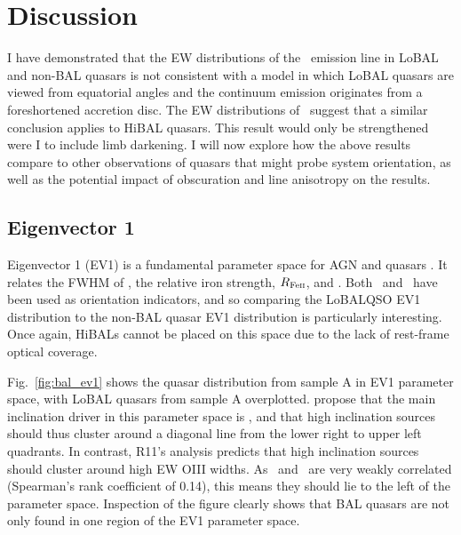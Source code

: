 \section{Discussion}
\label{sec:discuss_ew}
I have demonstrated that the EW distributions of the 
\oiiifull\ emission line in LoBAL and non-BAL
quasars is not consistent with a 
model in which LoBAL quasars are viewed from equatorial angles 
and the continuum emission originates from
a foreshortened accretion disc. The EW distributions of 
\civline\ suggest that a similar conclusion applies to HiBAL quasars.
This result would only be strengthened were 
I to include limb darkening. I will now explore how the above results compare to other
observations of quasars that might probe system orientation, as 
well as the potential impact of obscuration and line anisotropy
on the results.

\subsection{Eigenvector 1}

Eigenvector 1 (EV1) is a fundamental parameter space for AGN and quasars
\citep{borosongreen,sulentic2000ev1,marziani2001,shenho2014}. 
It relates the FWHM of \hb, the relative iron strength, 
$R_{{\rm Fe \textsc{ii}}}$, and
\ewo. Both \ewo\ and \fwh\ have been used as orientation
indicators, and so comparing the LoBALQSO EV1 distribution to the non-BAL 
quasar EV1 distribution is particularly interesting. Once again,
HiBALs cannot be placed on this space due to the lack of rest-frame 
optical coverage.

Fig.~\ref{fig:bal_ev1} shows the quasar distribution from sample A 
in EV1 parameter space, with LoBAL quasars from sample A overplotted.
\citet[][hereafter SH14]{shenho2014} propose 
that the main inclination driver in this parameter space
is \fwh, and that high inclination sources should thus cluster around
a diagonal line from the lower right to upper left quadrants. In contrast,
R11's analysis predicts that high inclination sources should cluster
around high EW OIII widths. As \ewo\ and \fwh\ are very weakly correlated
(Spearman's rank coefficient of 0.14), this means they should lie to
the left of the parameter space. Inspection of the figure clearly 
shows that BAL quasars are not only found in one region of the 
EV1 parameter space. 

